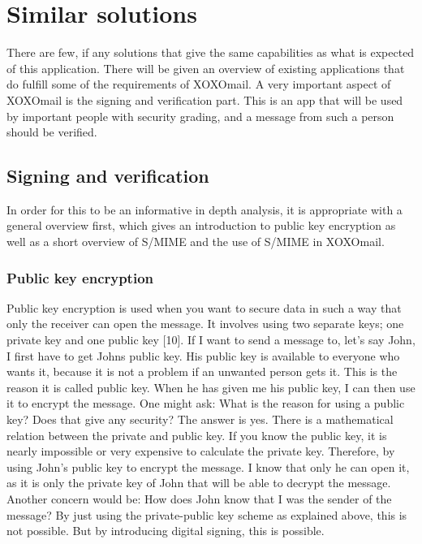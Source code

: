 \section{Similar solutions}
There are few, if any solutions that give the same capabilities as what is expected of this application. There will be given an overview of existing applications that do fulfill some of the requirements of XOXOmail.
\newline
\newline
A very important aspect of XOXOmail is the signing and verification part. This is an app that will be used by important people with security grading, and a message from such a person should be verified.

\subsection{Signing and verification}
In order for this to be an informative in depth analysis, it is appropriate with a general overview first, which gives an introduction to public key encryption as well as a short overview of S/MIME and the use of S/MIME in XOXOmail.

\subsubsection{Public key encryption}
Public key encryption is used when you want to secure data in such a way that only the receiver can open the message. It involves using two separate keys; one private key and one public key [10].
\newline
\newline
If I want to send a message to, let's say John, I first have to get Johns public key. His public key is available to everyone who wants it, because it is not a problem if an unwanted person gets it. This is the reason it is called public key. When he has given me his public key, I can then use it to encrypt the message. One might ask: What is the reason for using a
public key? Does that give any security? The answer is yes. There is a mathematical relation between the private and public key. If you know the public key, it is nearly impossible or very expensive to calculate the private key. Therefore, by using John's public key to encrypt the message. I know that only he can open it, as it is only the private key of John that will be able to decrypt the message.
\newline
\newline
Another concern would be: How does John know that I was the sender of the message? By just using the private-public key scheme as explained above, this is not possible. But by introducing digital signing, this is possible.

